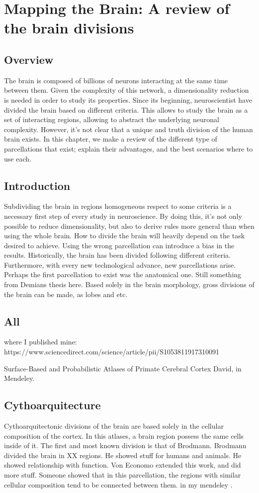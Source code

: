 \chapter{Mapping the Brain: A review of the brain divisions}

\section{Overview}
The brain is composed of billions of neurons interacting at the same time
between them. Given the complexity of this network, a dimensionality reduction
is needed in order to study its properties. Since its beginning, neuroscientist
have divided the brain based on different criteria. This allows to study the
brain as a set of interacting regions, allowing to abstract the underlying
neuronal complexity. However, it's not clear that a unique and truth division
of the human brain exists. In this chapter, we make a review of the different
type of parcellations that exist; explain their advantages, and the best
scenarios where to use each.

\section{Introduction}
Subdividing the brain in regions homogeneous respect to some criteria is a
necessary first step of every study in neuroscience. By doing this, it's not
only possible to reduce dimensionality, but also to derive rules more general
than when using the whole brain. How to divide the brain will heavily depend
on the task desired to achieve. Using the wrong parcellation can introduce
a bias in the results. Historically, the brain has been divided following
different criteria. Furthermore, with every new technological advance, new
parcellations arise. Perhaps the first parcellation to exist was the anatomical
one. Still something from Demians thesis here. Based solely in the brain
morphology, gross divisions of the brain can be made, as lobes and etc.



\section{All}
where I published mine:
https://www.sciencedirect.com/science/article/pii/S1053811917310091

Surface-Based and Probabilistic Atlases of Primate Cerebral Cortex
David, in Mendeley.

\section{Cythoarquitecture}
Cythoarquitectonic divisions of the brain are based solely in the cellular
composition of the cortex. In this atlases, a brain region possess the same
cells inside of it. The first and most known division is that of Brodmann.
Brodmann divided the brain in XX regions. He showed stuff for humans and
animals. He showed relationship with function.
Von Economo extended this work, and did more stuff. Someone showed that 
in this parcellation, the regions with similar cellular composition tend
to be connected between them.
in my mendeley \cite{Glover2011}.

